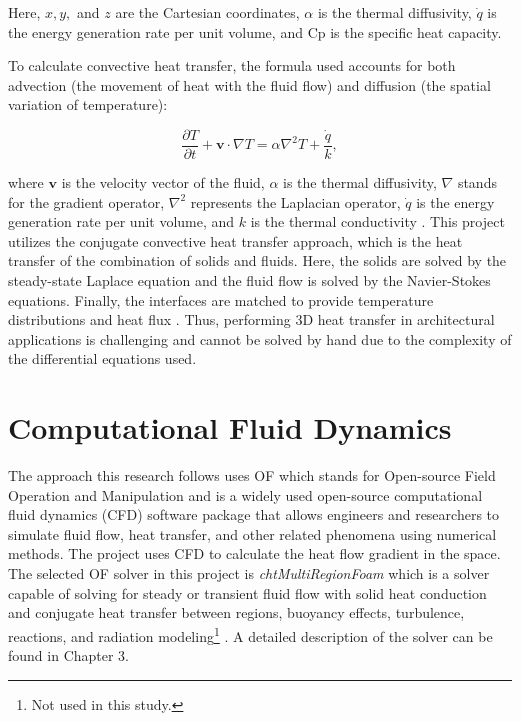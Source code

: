 	
Here, $x,y,$ and $z$ are the Cartesian coordinates, $\alpha$ is the thermal diffusivity, $\dot{q}$ is the energy generation rate per unit volume, and \gls{Cp} is the specific heat capacity.
 
To calculate convective heat transfer, the formula used accounts for both advection (the movement of heat with the fluid flow) and diffusion (the spatial variation of temperature): 

\begin{equation}
    \frac{\partial T}{\partial t} + \mathbf{v} \cdot \nabla T = \alpha \nabla^2 T + \frac{\dot{q}}{k},
\end{equation}

where $\mathbf{v}$ is the velocity vector of the fluid, $\alpha$ is the thermal diffusivity, $\nabla$ stands for the gradient operator, $\nabla^2$ represents the Laplacian operator, $\dot{q}$ is the energy generation rate per unit volume, and $k$ is the thermal conductivity \cite{bergman2011fundamentals}. This project utilizes the conjugate convective heat transfer approach, which is the heat transfer of the combination of solids and fluids. Here, the solids are solved by the steady-state Laplace equation and the fluid flow is solved by the Navier-Stokes equations. Finally, the interfaces are matched to provide temperature distributions and heat flux \cite{Zhao2007}. Thus, performing 3D heat transfer in architectural applications is challenging and cannot be solved by hand due to the complexity of the differential equations used.



\section{Computational Fluid Dynamics}
The approach this research follows uses \gls{OF} which stands for Open-source Field Operation and Manipulation and is a widely used open-source computational fluid dynamics  (CFD) software package that allows engineers and researchers to simulate fluid flow, heat transfer, and other related phenomena using numerical methods. The project uses CFD to calculate the heat flow gradient in the space. The selected \gls{OF} solver in this project is \textit{\gls{cht}MultiRegionFoam} which is a solver capable of solving for steady or transient fluid flow with solid heat conduction and conjugate heat transfer between regions, buoyancy effects, turbulence, reactions, and radiation modeling\footnote{Not used in this study.} \cite{cht}. A detailed description of the solver can be found in Chapter 3.


